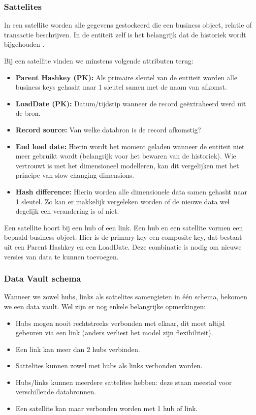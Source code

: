 \subsubsection{Sattelites}
In een satellite worden alle gegevens gestockeerd die een business object, relatie of transactie beschrijven. In de entiteit zelf is het belangrijk dat de historiek wordt bijgehouden \autocite{Linstedt2016}.

Bij een satellite vinden we minstens volgende attributen terug:

\begin{itemize}
	\item \textbf{Parent Hashkey (PK):} Als primaire sleutel van de entiteit worden alle business keys gehasht naar 1 sleutel samen met de naam van afkomst.
	\item \textbf{LoadDate (PK):} Datum/tijdstip wanneer de record geëxtraheerd werd uit de bron.
	\item \textbf{Record source:} Van welke databron is de record afkomstig?
	\item \textbf{End load date:} Hierin wordt het moment geladen wanneer de entiteit niet meer gebruikt wordt (belangrijk voor het bewaren van de historiek). Wie vertrouwt is met het dimensioneel modelleren, kan dit vergelijken met het principe van slow changing dimensions.
	\item \textbf{Hash difference:} Hierin worden alle dimensionele data samen gehasht naar 1 sleutel. Zo kan er makkelijk vergeleken worden of de nieuwe data wel degelijk een verandering is of niet.
\end{itemize} 

Een satellite hoort bij een hub of een link. Een hub en een satellite vormen een bepaald business object. Hier is de primary key een composite key, dat bestaat uit een Parent Hashkey en een LoadDate. Deze combinatie is nodig om nieuwe versies van data te kunnen toevoegen.

\subsubsection{Data Vault schema}
Wanneer we zowel hubs, links als sattelites samengieten in één schema, bekomen we een data vault. Wel zijn er nog enkele belangrijke opmerkingen:

\begin{itemize}
	\item Hubs mogen nooit rechtstreeks verbonden met elkaar, dit moet altijd gebeuren via een link (anders verliest het model zijn flexibiliteit).
	\item Een link kan meer dan 2 hubs verbinden.
	\item Sattelites kunnen zowel met hubs als links verbonden worden.
	\item Hubs/links kunnen meerdere sattelites hebben: deze staan meestal voor verschillende databronnen.
	\item Een satellite kan maar verbonden worden met 1 hub of link. 
\end{itemize} 

